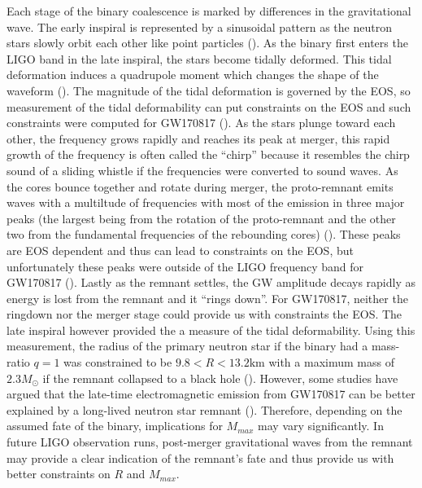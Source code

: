 Each stage of the binary coalescence is marked by differences in the gravitational wave. The early inspiral is represented by a sinusoidal pattern as the neutron stars slowly orbit each other like point particles (\citet*{bauswein2019spectral}). As the binary first enters the LIGO band in the late inspiral, the stars become tidally deformed. This tidal deformation induces a quadrupole moment which changes the shape of the waveform (\citet*{hinderer2010tidal}). The magnitude of the tidal deformation is governed by the EOS, so measurement of the tidal deformability can put constraints on the EOS and such constraints were computed for GW170817 (\citet*{Abbott:2018exr,raithel2019constraints}). As the stars plunge toward each other, the frequency grows rapidly and reaches its peak at merger, this rapid growth of the frequency is often called the ``chirp'' because it resembles the chirp sound of a sliding whistle if the frequencies were converted to sound waves. As the cores bounce together and rotate during merger, the proto-remnant emits waves with a multiltude of frequencies with most of the emission in three major peaks (the largest being from the rotation of the proto-remnant and the other two from the fundamental frequencies of the rebounding cores) (\citet*{takami:2015}). These peaks are EOS dependent and thus can lead to constraints on the EOS, but unfortunately these peaks were outside of the LIGO frequency band for GW170817 (\citet*{Abbott:2017dke}). Lastly as the remnant settles, the GW amplitude decays rapidly as energy is lost from the remnant and it ``rings down''. For GW170817, neither the ringdown nor the merger stage could provide us with constraints the EOS. The late inspiral however provided the a measure of the tidal deformability. Using this measurement, the radius of the primary neutron star if the binary had a mass-ratio $q=1$ was constrained to be $9.8 < R < 13.2 \text{km}$ with a maximum mass of $2.3M_\odot$ if the remnant collapsed to a black hole (\citet*{Abbott:2018exr,raithel2019constraints}). However, some studies have argued that the late-time electromagnetic emission from GW170817 can be better explained by a long-lived neutron star remnant (\citet*{yu2018long}).  Therefore, depending on the assumed fate of the binary, implications for $M_{max}$ may vary significantly. In future LIGO observation runs, post-merger gravitational waves from the remnant may provide a clear indication of the remnant’s fate and thus provide us with better constraints on $R$ and $M_{max}$.
  
